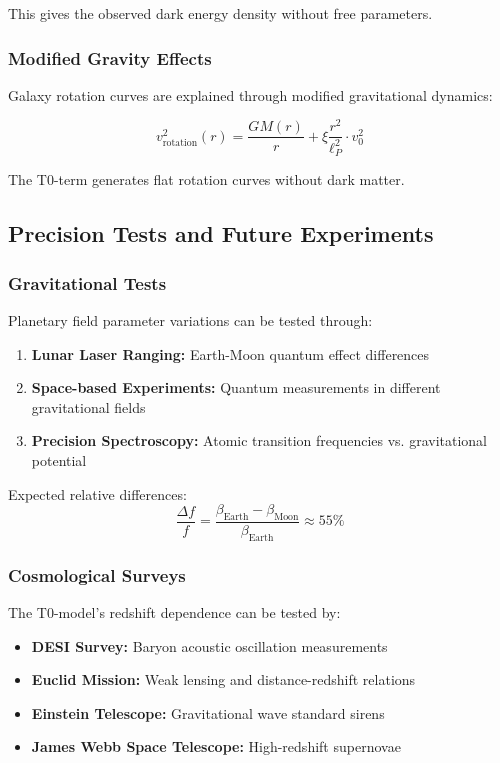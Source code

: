 \documentclass[12pt,a4paper]{article}
\theoremstyle{definition}
\begin{document}
This gives the observed dark energy density without free parameters.

\subsubsection{Modified Gravity Effects}

Galaxy rotation curves are explained through modified gravitational dynamics:

\begin{equation}
	v_{\text{rotation}}^2(r) = \frac{GM(r)}{r} + \xi \frac{r^2}{\ell_P^2} \cdot v_0^2
\end{equation}

The T0-term generates flat rotation curves without dark matter.

\subsection{Precision Tests and Future Experiments}

\subsubsection{Gravitational Tests}

Planetary field parameter variations can be tested through:

\begin{enumerate}
	\item \textbf{Lunar Laser Ranging:} Earth-Moon quantum effect differences
	\item \textbf{Space-based Experiments:} Quantum measurements in different gravitational fields
	\item \textbf{Precision Spectroscopy:} Atomic transition frequencies vs. gravitational potential
\end{enumerate}

Expected relative differences:
\begin{equation}
	\frac{\Delta f}{f} = \frac{\beta_{\text{Earth}} - \beta_{\text{Moon}}}{\beta_{\text{Earth}}} \approx 55\%
\end{equation}

\subsubsection{Cosmological Surveys}

The T0-model's redshift dependence can be tested by:

\begin{itemize}
	\item \textbf{DESI Survey:} Baryon acoustic oscillation measurements
	\item \textbf{Euclid Mission:} Weak lensing and distance-redshift relations
	\item \textbf{Einstein Telescope:} Gravitational wave standard sirens
	\item \textbf{James Webb Space Telescope:} High-redshift supernovae
\end{itemize}
\end{document}
